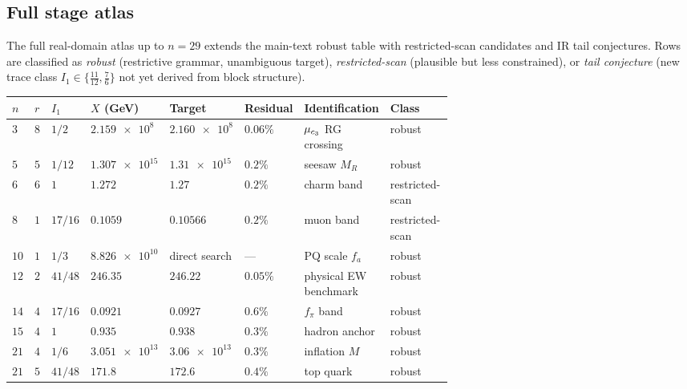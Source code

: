 \subsection{Full stage atlas}

The full real-domain atlas up to $n=29$ extends the main-text robust table with restricted-scan candidates and IR tail conjectures. Rows are classified as \emph{robust} (restrictive grammar, unambiguous target), \emph{restricted-scan} (plausible but less constrained), or \emph{tail conjecture} (new trace class $I_1\in\{\frac{11}{12},\frac{7}{6}\}$ not yet derived from block structure).

\begin{table}[H]
\centering
\scriptsize
\setlength{\tabcolsep}{2pt}
\begin{tabularx}{\linewidth}{@{}>{\centering\arraybackslash}p{0.035\linewidth}>{\centering\arraybackslash}p{0.035\linewidth}>{\raggedright\arraybackslash}p{0.065\linewidth}>{\raggedleft\arraybackslash}p{0.12\linewidth}>{\raggedleft\arraybackslash}p{0.12\linewidth}>{\raggedright\arraybackslash}p{0.09\linewidth}>{\raggedright\arraybackslash}p{0.17\linewidth}Y@{}}
\toprule
$n$ & $r$ & $I_1$ & $X$ (GeV) & Target & Residual & Identification & Class \\
\midrule
$3$ & $8$ & $1/2$ & $\num{2.159e8}$ & $\num{2.160e8}$ & $0.06\%$ & $\mu_{c_3}$ RG crossing & robust \\
$5$ & $5$ & $1/12$ & $\num{1.307e15}$ & $\num{1.31e15}$ & $0.2\%$ & seesaw $M_R$ & robust \\
$6$ & $6$ & $1$ & $\num{1.272}$ & $\num{1.27}$ & $0.2\%$ & charm band & restricted-scan \\
$8$ & $1$ & $17/16$ & $\num{0.1059}$ & $\num{0.10566}$ & $0.2\%$ & muon band & restricted-scan \\
$10$ & $1$ & $1/3$ & $\num{8.826e10}$ & direct search & --- & PQ scale $f_a$ & robust \\
$12$ & $2$ & $41/48$ & $\num{246.35}$ & $\num{246.22}$ & $0.05\%$ & physical EW benchmark & robust \\
$14$ & $4$ & $17/16$ & $\num{0.0921}$ & $\num{0.0927}$ & $0.6\%$ & $f_\pi$ band & robust \\
$15$ & $4$ & $1$ & $\num{0.935}$ & $\num{0.938}$ & $0.3\%$ & hadron anchor & robust \\
$21$ & $4$ & $1/6$ & $\num{3.051e13}$ & $\num{3.06e13}$ & $0.3\%$ & inflation $M$ & robust \\
$21$ & $5$ & $41/48$ & $\num{171.8}$ & $\num{172.6}$ & $0.4\%$ & top quark & robust \\

\end{tabularx}
\end{table}
